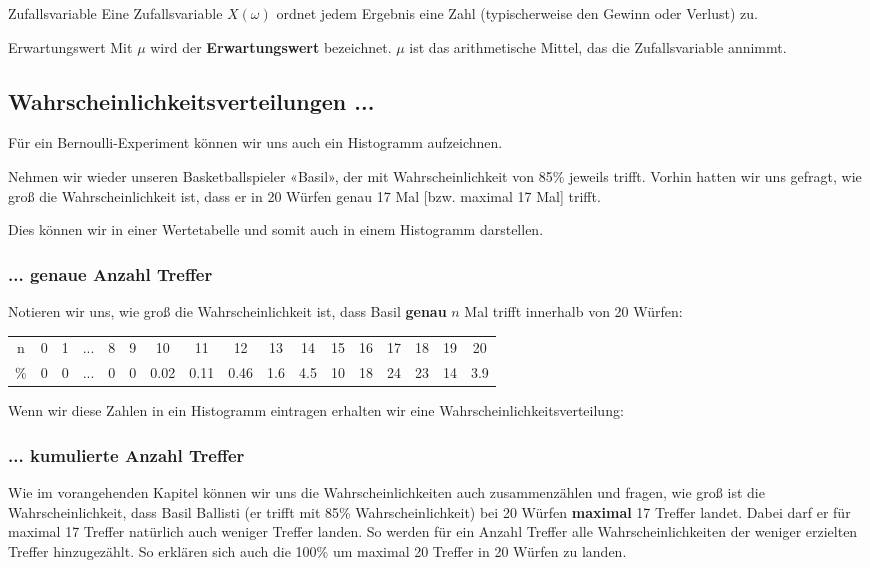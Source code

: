 \begin{definition}{Zufallsvariable}{}
	Eine Zufallsvariable $X(\omega)$ ordnet jedem Ergebnis eine Zahl
	(typischerweise den Gewinn oder Verlust) zu.
\end{definition}


\begin{definition}{Erwartungswert}{}
	Mit $\mu$ wird der \textbf{Erwartungswert} bezeichnet.
	$\mu$ ist das arithmetische Mittel, das die Zufallsvariable
	annimmt.
\end{definition}
\newpage



\subsection{Wahrscheinlichkeitsverteilungen ...}

Für ein Bernoulli-Experiment können wir uns auch ein Histogramm aufzeichnen.

Nehmen wir wieder unseren Basketballspieler «Basil», der mit Wahrscheinlichkeit von 85\% jeweils trifft. Vorhin hatten wir uns gefragt, wie groß die Wahrscheinlichkeit ist, dass er in 20 Würfen genau 17 Mal [bzw. maximal 17 Mal] trifft.

Dies können wir in einer Wertetabelle und somit auch in einem Histogramm darstellen.
\newpage


\subsubsection{... genaue Anzahl Treffer}
Notieren wir uns, wie groß die Wahrscheinlichkeit ist, dass Basil \textbf{genau} $n$ Mal trifft innerhalb von 20 Würfen:

\begin{tabular}{c|cccccccccccccccc}
  n & 0 & 1 & ... & 8 & 9 & 10   & 11   & 12   & 13  & 14  & 15 & 16 & 17 & 18 & 19 &  20\\
  \%& 0 & 0 & ... & 0 & 0 & 0.02 & 0.11 & 0.46 & 1.6 & 4.5 & 10 & 18 & 24 & 23 & 14 & 3.9
\end{tabular}

Wenn wir diese Zahlen in ein Histogramm eintragen erhalten wir eine
Wahrscheinlichkeitsverteilung:




\subsubsection{... kumulierte Anzahl Treffer}
Wie im vorangehenden Kapitel können wir uns die Wahrscheinlichkeiten
auch zusammenzählen und \zB fragen, wie groß ist die
Wahrscheinlichkeit, dass Basil Ballisti (er trifft mit 85\%
Wahrscheinlichkeit) bei 20 Würfen \textbf{maximal} 17
Treffer landet. Dabei darf er für maximal 17 Treffer natürlich auch
weniger Treffer landen. So werden für ein Anzahl Treffer alle
Wahrscheinlichkeiten der weniger erzielten Treffer hinzugezählt. So
erklären sich auch die 100\% um maximal 20 Treffer in 20 Würfen zu
landen.

